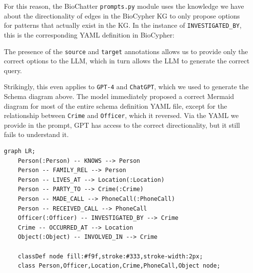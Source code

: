 For this reason, the BioChatter \texttt{prompts.py} module uses the knowledge we have
about the directionality of edges in the BioCypher KG to only propose options
for patterns that actually exist in the KG. In the instance of
\texttt{INVESTIGATED\_BY}, this is the corresponding YAML definition in BioCypher:

\begin{Shaded}
\begin{Highlighting}[]
\KeywordTok{:}
\AttributeTok{    }\KeywordTok{:}\AttributeTok{ }\KeywordTok{[}\KeywordTok{,}\KeywordTok{]}
\AttributeTok{    }\KeywordTok{:}
\AttributeTok{    }\KeywordTok{:}
\AttributeTok{    }\KeywordTok{:}
\AttributeTok{    }\KeywordTok{:}
\AttributeTok{    }\KeywordTok{:}
\end{Highlighting}
\end{Shaded}

The presence of the \texttt{source} and \texttt{target} annotations allows us to provide only
the correct options to the LLM, which in turn allows the LLM to generate the
correct query.

Strikingly, this even applies to \texttt{GPT-4} and \texttt{ChatGPT}, which we used to
generate the Schema diagram above. The model immediately proposed a correct
Mermaid diagram for most of the entire schema definition YAML file, except for
the relationship between \texttt{Crime} and \texttt{Officer}, which it reversed. Via the YAML
we provide in the prompt, GPT has access to the correct directionality, but it
still fails to understand it.

\begin{verbatim}
graph LR;
    Person(:Person) -- KNOWS --> Person
    Person -- FAMILY_REL --> Person
    Person -- LIVES_AT --> Location(:Location)
    Person -- PARTY_TO --> Crime(:Crime)
    Person -- MADE_CALL --> PhoneCall(:PhoneCall)
    Person -- RECEIVED_CALL --> PhoneCall
    Officer(:Officer) -- INVESTIGATED_BY --> Crime
    Crime -- OCCURRED_AT --> Location
    Object(:Object) -- INVOLVED_IN --> Crime

    classDef node fill:#f9f,stroke:#333,stroke-width:2px;
    class Person,Officer,Location,Crime,PhoneCall,Object node;
\end{verbatim}

